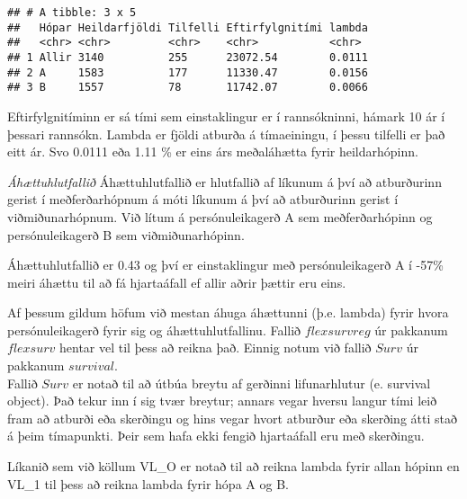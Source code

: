 \documentclass[
]{book}
\newenvironment{Shaded}{\begin{snugshade}}{\end{snugshade}}
\newcommand{\DecValTok}[1]{\textcolor[rgb]{0.00,0.00,0.81}{#1}}
\newcommand{\NormalTok}[1]{#1}
\newcommand{\OperatorTok}[1]{\textcolor[rgb]{0.81,0.36,0.00}{\textbf{#1}}}
\newcommand{\StringTok}[1]{\textcolor[rgb]{0.31,0.60,0.02}{#1}}
\begin{document}
\begin{verbatim}
## # A tibble: 3 x 5
##   Hópar Heildarfjöldi Tilfelli Eftirfylgnitími lambda
##   <chr> <chr>         <chr>    <chr>           <chr> 
## 1 Allir 3140          255      23072.54        0.0111
## 2 A     1583          177      11330.47        0.0156
## 3 B     1557          78       11742.07        0.0066
\end{verbatim}

Eftirfylgnitíminn er sá tími sem einstaklingur er í rannsókninni, hámark 10 ár í þessari rannsókn. Lambda er fjöldi atburða á tímaeiningu, í þessu tilfelli er það eitt ár. Svo 0.0111 eða 1.11 \% er eins árs meðaláhætta fyrir heildarhópinn.

\emph{Áhættuhlutfallið}
Áhættuhlutfallið er hlutfallið af líkunum á því að atburðurinn gerist í meðferðarhópnum á móti líkunum á því að atburðurinn gerist í viðmiðunarhópnum. Við lítum á persónuleikagerð A sem meðferðarhópinn og persónuleikagerð B sem viðmiðunarhópinn.

\begin{Shaded}
\end{Shaded}

Áhættuhlutfallið er 0.43 og því er einstaklingur með persónuleikagerð A í -57\% meiri áhættu til að fá hjartaáfall ef allir aðrir þættir eru eins.

Af þessum gildum höfum við mestan áhuga áhættunni (þ.e. lambda) fyrir hvora persónuleikagerð fyrir sig og áhættuhlutfallinu. Fallið \(flexsurvreg\) úr pakkanum \(flexsurv\) hentar vel til þess að reikna það. Einnig notum við fallið \(Surv\) úr pakkanum \(survival\).\\
Fallið \(Surv\) er notað til að útbúa breytu af gerðinni lifunarhlutur (e. survival object). Það tekur inn í sig tvær breytur; annars vegar hversu langur tími leið fram að atburði eða skerðingu og hins vegar hvort atburður eða skerðing átti stað á þeim tímapunkti. Þeir sem hafa ekki fengið hjartaáfall eru með skerðingu.

Líkanið sem við köllum VL\_O er notað til að reikna lambda fyrir allan hópinn en VL\_1 til þess að reikna lambda fyrir hópa A og B.
\end{document}
